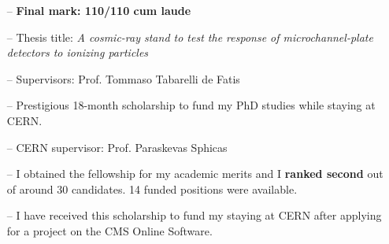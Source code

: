 \documentclass[10pt,a4paper]{altacv}
\begin{document}
\begin{itemize}
    \setlength{\itemindent}{0.5em}
    \item[--]   \textbf{Final mark: 110/110 cum laude}
    \item[--]   Thesis title: \textit{A cosmic-ray stand to test the response of microchannel-plate detectors to ionizing particles}
    \item[--]   Supervisors: Prof. Tommaso Tabarelli de Fatis
\end{itemize}



\begin{itemize}
    \setlength{\itemindent}{0.5em}
    \item[--]   Prestigious 18-month scholarship to fund my PhD studies while staying at CERN. 
    \item[--]   CERN supervisor: Prof. Paraskevas Sphicas
\end{itemize}

\medskip


\begin{itemize}
    \setlength{\itemindent}{0.5em}
    \item[--]   I obtained the fellowship for my academic merits and I \textbf{ranked second} out of around 30 candidates. 14 funded positions were available.
\end{itemize}

\medskip


\begin{itemize}
    \setlength{\itemindent}{0.5em}
    \item[--]   I have received this scholarship to fund my staying at CERN after applying for a project on the CMS Online Software.
\end{itemize}

\newpage


\end{document}
